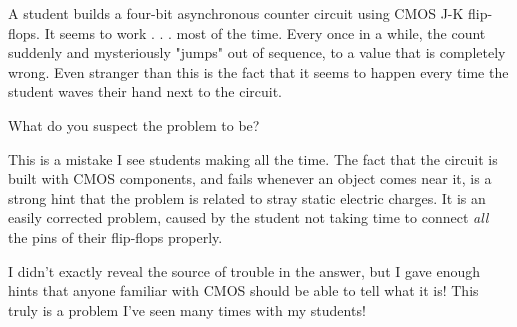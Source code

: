 

A student builds a four-bit asynchronous counter circuit using CMOS J-K flip-flops.  It seems to work . . . most of the time.  Every once in a while, the count suddenly and mysteriously "jumps" out of sequence, to a value that is completely wrong.  Even stranger than this is the fact that it seems to happen every time the student waves their hand next to the circuit.

What do you suspect the problem to be?







This is a mistake I see students making all the time.  The fact that the circuit is built with CMOS components, and fails whenever an object comes near it, is a strong hint that the problem is related to stray static electric charges.  It is an easily corrected problem, caused by the student not taking time to connect {\it all} the pins of their flip-flops properly.







I didn't exactly reveal the source of trouble in the answer, but I gave enough hints that anyone familiar with CMOS should be able to tell what it is!  This truly is a problem I've seen many times with my students!




